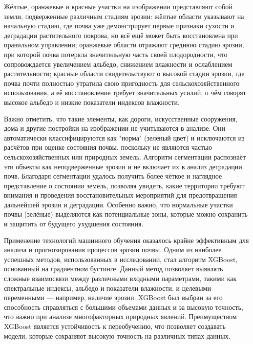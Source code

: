 \begin{multicols}{2}
Жёлтые, оранжевые и красные участки на изображении представляют собой
земли, подверженные различным стадиям эрозии: жёлтые области указывают
на начальную стадию, где почва уже демонстрирует первые признаки сухости
и деградации растительного покрова, но всё ещё может быть восстановлена
при правильном управлении; оранжевые области отражают среднюю стадию
эрозии, при которой почва потеряла значительную часть своей
плодородности, что сопровождается увеличением альбедо, снижением
влажности и ослаблением растительности; красные области свидетельствуют
о высокой стадии эрозии, где почва почти полностью утратила свою
пригодность для сельскохозяйственного использования, а её восстановление
требует значительных усилий, о чём говорят высокое альбедо и низкие
показатели индексов влажности.

Важно отметить, что такие элементы, как дороги, искусственные
сооружения, дома и другие постройки на изображении не учитываются в
анализе. Они автоматически классифицируются как "норма" (зелёный цвет) и
исключаются из расчётов при оценке состояния почвы, поскольку не
являются частью сельскохозяйственных или природных земель. Алгоритм
сегментации распознаёт эти объекты как неподверженные эрозии и не
включает их в анализ деградации почв. Благодаря сегментации удалось
получить более чёткое и наглядное представление о состоянии земель,
позволяя увидеть, какие территории требуют внимания и проведения
восстановительных мероприятий для предотвращения дальнейшей эрозии и
деградации. Особенно важно, что нормальные участки почвы (зелёные)
выделяются как потенциальные зоны, которые можно сохранить и защитить от
будущего ухудшения состояния.

Применение технологий машинного обучения оказалось крайне эффективным
для анализа и прогнозирования процессов эрозии почвы. Одним из наиболее
успешных методов, использованных в исследовании, стал алгоритм XGBoost,
основанный на градиентном бустинге. Данный метод позволяет выявлять
сложные взаимосвязи между различными входными параметрами, такими как
спектральные индексы, альбедо и показатели влажности, и целевыми
переменными --- например, наличие эрозии. XGBoost был выбран за его
способность справляться с большими объемами данных и за высокую
точность, что важно при анализе многофакторных природных явлений.
Преимуществом XGBoost является устойчивость к переобучению, что
позволяет создавать модели, которые сохраняют высокую точность на
различных типах данных.


\end{multicols}
